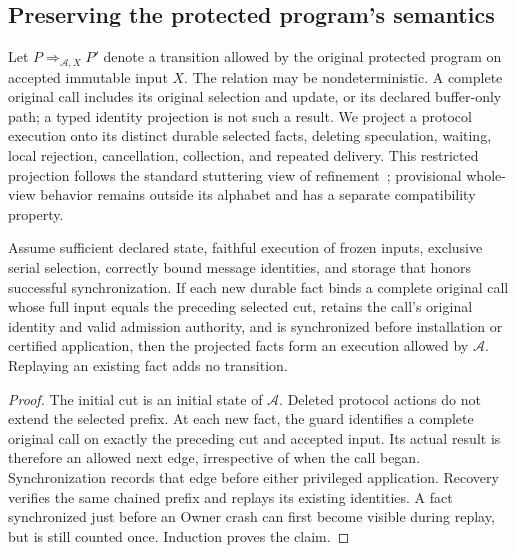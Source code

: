 \subsection{Preserving the protected program's semantics}
\label{subsec:native_refinement}
Let $P \mathrel{\Rightarrow_{\mathcal A,X}} P'$ denote a transition allowed
by the original protected program on accepted immutable input $X$.
The relation may be nondeterministic. A complete original call includes
its original selection and update, or its declared buffer-only path;
a typed identity projection is not such a result. We project a protocol
execution onto its distinct durable selected facts, deleting speculation,
waiting, local rejection, cancellation, collection, and repeated delivery.
This restricted projection follows the standard stuttering view of
refinement~\cite{abadi1991refinement}; provisional whole-view behavior
remains outside its alphabet and has a separate compatibility property.

\begin{proposition}
\label{prop:refinement}
Assume sufficient declared state, faithful execution of frozen inputs,
exclusive serial selection, correctly bound message identities, and
storage that honors successful synchronization. If each new durable fact
binds a complete original call whose full input equals the preceding
selected cut, retains the call's original identity and valid admission
authority, and is synchronized before installation or certified
application, then the projected facts form an execution allowed by
$\mathcal A$. Replaying an existing fact adds no transition.
\end{proposition}
\begin{proof}
The initial cut is an initial state of $\mathcal A$. Deleted protocol
actions do not extend the selected prefix. At each new fact, the guard
identifies a complete original call on exactly the preceding cut and
accepted input. Its actual result is therefore an allowed next edge,
irrespective of when the call began. Synchronization records that edge
before either privileged application. Recovery verifies the same chained
prefix and replays its existing identities. A fact synchronized just
before an Owner crash can first become visible during replay, but is
still counted once. Induction proves the claim.
\end{proof}

